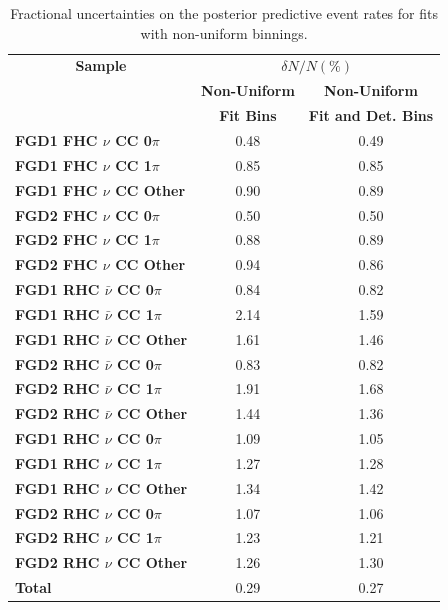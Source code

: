 \begin{center}
\begin{table}
\center
\begin{tabular}{l||c c}
\hline \hline
\multicolumn{1}{c||}{\textbf{Sample}} & \multicolumn{2}{c}{$\delta N/N(\%)$}\\
& \multicolumn{1}{c}{\textbf{Non-Uniform}} & \multicolumn{1}{c}{\textbf{Non-Uniform}}\\
& \multicolumn{1}{c}{\textbf{Fit Bins}} & \multicolumn{1}{c}{\textbf{Fit and Det. Bins}}\\
\hline
\hline
\textbf{FGD1 FHC $\nu$ CC 0$\pi$} & 0.48 & 0.49\\
\textbf{FGD1 FHC $\nu$ CC 1$\pi$} & 0.85 & 0.85\\ 
\textbf{FGD1 FHC $\nu$ CC Other} & 0.90 & 0.89\\ \hline
\textbf{FGD2 FHC $\nu$ CC 0$\pi$} & 0.50 & 0.50\\
\textbf{FGD2 FHC $\nu$ CC 1$\pi$} & 0.88 & 0.89\\
\textbf{FGD2 FHC $\nu$ CC Other} & 0.94 & 0.86\\ \hline
\textbf{FGD1 RHC $\bar{\nu}$ CC 0$\pi$} & 0.84 & 0.82\\
\textbf{FGD1 RHC $\bar{\nu}$ CC 1$\pi$} & 2.14 & 1.59\\
\textbf{FGD1 RHC $\bar{\nu}$ CC Other} & 1.61 & 1.46\\ \hline
\textbf{FGD2 RHC $\bar{\nu}$ CC 0$\pi$} & 0.83 & 0.82\\
\textbf{FGD2 RHC $\bar{\nu}$ CC 1$\pi$} & 1.91 & 1.68\\
\textbf{FGD2 RHC $\bar{\nu}$ CC Other} & 1.44 & 1.36\\ \hline
\textbf{FGD1 RHC $\nu$ CC 0$\pi$} & 1.09 & 1.05\\
\textbf{FGD1 RHC $\nu$ CC 1$\pi$} & 1.27 & 1.28\\
\textbf{FGD1 RHC $\nu$ CC Other} & 1.34 & 1.42\\ \hline
\textbf{FGD2 RHC $\nu$ CC 0$\pi$} & 1.07 & 1.06\\
\textbf{FGD2 RHC $\nu$ CC 1$\pi$} & 1.23 & 1.21\\ 
\textbf{FGD2 RHC $\nu$ CC Other} & 1.26 & 1.30\\ \hline
\textbf{Total} & 0.29 & 0.27 \\ \hline\hline
\end{tabular}
\caption{Fractional uncertainties on the posterior predictive event rates for fits with non-uniform binnings.}
\label{tab:polyprederr}
\end{table}
\end{center}

